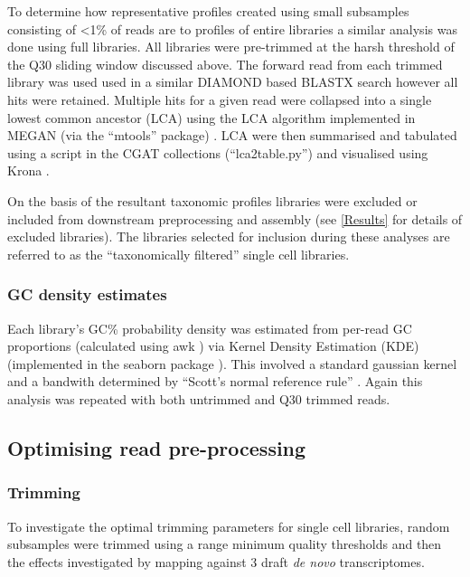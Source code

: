 To determine how representative profiles created using small subsamples 
consisting of <1\% of reads are to profiles of entire libraries a similar analysis
was done using full libraries. All libraries were pre-trimmed at the harsh
threshold of the Q30 sliding window discussed above. 
The forward read from each trimmed library was used 
used in a similar DIAMOND based BLASTX search however all hits were retained.
Multiple hits for a given read were collapsed 
into a single lowest common ancestor (LCA) using the LCA algorithm \citep{Gabow1985} implemented in MEGAN (via the ``mtools''
package) \citep{Huson2007,el2013improved}.  LCA were then summarised and tabulated using
a script in the CGAT collections (``lca2table.py'') \citep{Sims2014} and visualised 
using Krona \citep{Ondov2011}.

On the basis of the resultant taxonomic profiles libraries were excluded or included
from downstream preprocessing and assembly (see \ref{Results} for details of excluded
libraries). The libraries selected for inclusion during these analyses 
are referred to as the ``taxonomically filtered'' single cell libraries.

\subsubsection{GC density estimates}

Each library's GC\% probability density was estimated from per-read GC proportions
(calculated using awk \citep{Aho1987}) via Kernel Density Estimation (KDE) \citep{Rosenblatt1956,Parzen1962} 
(implemented in the seaborn package \citep{michael_waskom_2015_19108}).
This involved a standard gaussian kernel and a bandwith determined by ``Scott's normal reference rule'' \citep{Scott1979}.  
Again this analysis was repeated with both untrimmed and Q30 trimmed reads. 

\subsection{Optimising read pre-processing}

\subsubsection{Trimming}

To investigate the optimal trimming parameters for single cell libraries, 
random subsamples were trimmed using a range minimum quality thresholds and then the effects investigated
by mapping against 3 draft \textit{de novo} transcriptomes.

